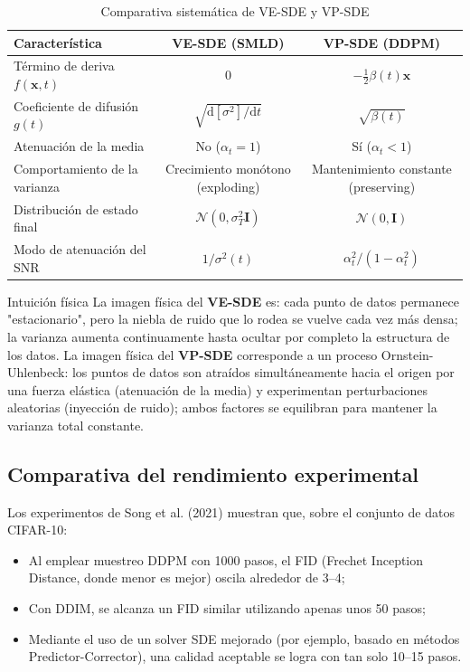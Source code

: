 \documentclass[a4paper]{article}
\begin{document}
\begin{table}[H]
\centering
\begin{tabular}{lcc}
\toprule
\textbf{Característica} & \textbf{VE-SDE (SMLD)} & \textbf{VP-SDE (DDPM)} \\
\midrule
Término de deriva $f(\mathbf{x},t)$ & $0$ & $-\frac{1}{2}\beta(t)\mathbf{x}$ \\
Coeficiente de difusión $g(t)$ & $\sqrt{\mathrm{d}[\sigma^2]/\mathrm{d}t}$ & $\sqrt{\beta(t)}$ \\
Atenuación de la media & No ($\alpha_t = 1$) & Sí ($\alpha_t < 1$) \\
Comportamiento de la varianza & Crecimiento monótono (exploding) & Mantenimiento constante (preserving) \\
Distribución de estado final & $\mathcal{N}(0, \sigma_T^2 \mathbf{I})$ & $\mathcal{N}(0, \mathbf{I})$ \\
Modo de atenuación del SNR & $1/\sigma^2(t)$ & $\alpha_t^2/(1-\alpha_t^2)$ \\
\bottomrule
\end{tabular}
\caption{Comparativa sistemática de VE-SDE y VP-SDE}
\end{table}

\begin{knowledgebox}{Intuición física}
La imagen física del \textbf{VE-SDE} es: cada punto de datos permanece "estacionario", pero la niebla de ruido que lo rodea se vuelve cada vez más densa; la varianza aumenta continuamente hasta ocultar por completo la estructura de los datos. La imagen física del \textbf{VP-SDE} corresponde a un proceso Ornstein-Uhlenbeck: los puntos de datos son atraídos simultáneamente hacia el origen por una fuerza elástica (atenuación de la media) y experimentan perturbaciones aleatorias (inyección de ruido); ambos factores se equilibran para mantener la varianza total constante.
\end{knowledgebox}

\subsection{Comparativa del rendimiento experimental}

Los experimentos de Song et al. (2021) muestran que, sobre el conjunto de datos CIFAR-10:
\begin{itemize}
    \item Al emplear muestreo DDPM con 1000 pasos, el FID (Frechet Inception Distance, donde menor es mejor) oscila alrededor de 3--4;
    \item Con DDIM, se alcanza un FID similar utilizando apenas unos 50 pasos;
    \item Mediante el uso de un solver SDE mejorado (por ejemplo, basado en métodos Predictor-Corrector), una calidad aceptable se logra con tan solo 10--15 pasos.
\end{itemize}
\end{document}
